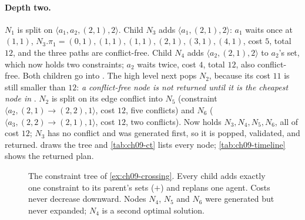 \paragraph{Depth two.} $N_1$ is split on $\langle a_1, a_2, (2,1), 2\rangle$.
Child $N_3$ adds $\langle a_1, (2,1), 2\rangle$: $a_1$ waits once at
$(1,1)$, $N_3.\pi_1 = (0,1),(1,1),(1,1),(2,1),(3,1),(4,1)$, cost $5$, total
$12$, and the three paths are conflict-free. Child $N_4$ adds
$\langle a_2, (2,1), 2\rangle$ to $a_2$'s set, which now holds two
constraints; $a_2$ waits twice, cost $4$, total $12$, also conflict-free.
Both children go into \Open. The high level next pops $N_2$, because its
cost $11$ is still smaller than $12$: \emph{a conflict-free node is not
returned until it is the cheapest node in} \Open. $N_2$ is split on its
edge conflict into $N_5$ (constraint $\langle a_2, (2,1)\to(2,2), 1\rangle$,
cost $12$, five conflicts) and $N_6$ ($\langle a_3, (2,2)\to(2,1), 1\rangle$,
cost $12$, two conflicts). Now \Open holds $N_3, N_4, N_5, N_6$, all of cost
$12$; $N_3$ has no conflict and was generated first, so it is popped,
validated, and returned.  draws the tree and
\cref{tab:ch09-ct} lists every node; \cref{tab:ch09-timeline} shows the
returned plan.

\begin{figure}[tb]
  \centering
  \caption{The constraint tree of \cref{ex:ch09-crossing}. Every child adds
    exactly one constraint to its parent's sets ($+$) and replans one agent.
    Costs never decrease downward. Nodes $N_4$, $N_5$ and $N_6$ were
    generated but never expanded; $N_4$ is a second optimal solution.}
  \label{fig:ch09-tree}
\end{figure}

